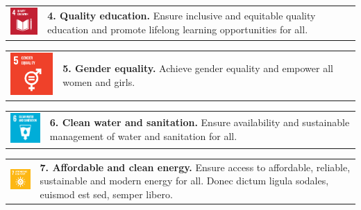 \begin{multicols}{2}
    \noindent
    \begin{tabular}{p{25mm} p{46mm}}
        \vspace{0mm} \includegraphics[width=2cm]{text/appendix/appendix-sdg/resources/sdg4.pdf} & \vspace{-0.5mm} \textbf{4. Quality education.} Ensure inclusive and equitable quality education and promote lifelong learning opportunities for all. \\
    \end{tabular}

    \noindent
    \begin{tabular}{p{25mm} p{46mm}}
        \vspace{0mm} \includegraphics[width=2cm]{text/appendix/appendix-sdg/resources/sdg5.pdf} & \vspace{-0.5mm} \textbf{5. Gender equality.} Achieve gender equality and empower all women and girls.  \\
    \end{tabular}

    \noindent
    \begin{tabular}{p{25mm} p{46mm}}
        \vspace{0mm} \includegraphics[width=2cm]{text/appendix/appendix-sdg/resources/sdg6.pdf} & \vspace{-0.5mm} \textbf{6. Clean water and sanitation.} Ensure availability and sustainable management of water and sanitation for all.\\
    \end{tabular}

    \noindent
    \begin{tabular}{p{25mm} p{46mm}}
        \vspace{0mm} \includegraphics[width=2cm]{text/appendix/appendix-sdg/resources/sdg7.pdf} & \vspace{-0.5mm} \textbf{7. Affordable and clean energy.} Ensure access to affordable, reliable, sustainable and modern energy for all. Donec dictum ligula sodales, euismod est sed, semper libero.  \\
    \end{tabular}


\end{multicols}
